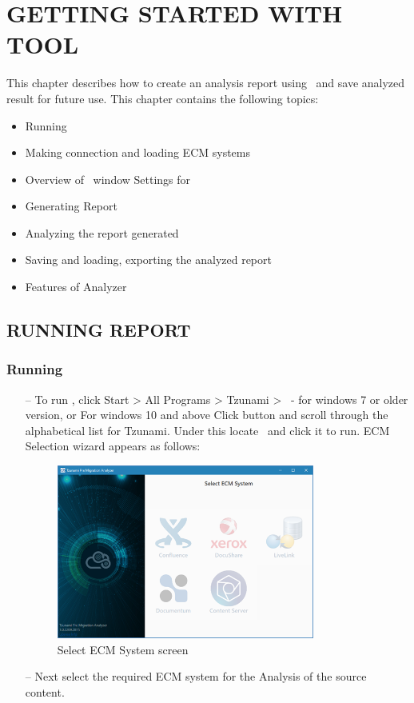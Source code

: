 \chapter{GETTING STARTED WITH \MakeUppercase{\appName} TOOL}
This chapter describes how to create an analysis report using \appName\ and save analyzed result for future use. This chapter contains the following topics:
\begin{itemize}
  \item Running \appName
  \item Making connection and loading ECM systems
  \item Overview of \appName\ window Settings for \appName
  \item Generating Report
  \item Analyzing the report generated
  \item Saving and loading, exporting the analyzed report
  \item Features of Analyzer
\end{itemize}
 \section{RUNNING \MakeUppercase{\appName} REPORT}

\subsection{Running \appName}
\begin{itemize}
\item[--] To run \appName, click Start > All Programs > Tzunami > \appName\ - for windows 7 or older version, or
For windows 10 and above
Click    button and scroll through the alphabetical list for Tzunami. Under this locate \appName\ and click it to run. ECM Selection wizard appears as follows:
\begin{figure} 
  \centering
	\includegraphics[width=0.8\textwidth]{Images/SelectEccmScreen.png}
 \caption{Select ECM System screen}
\end{figure}
\item[--] Next select the required ECM system for the Analysis of the source content.
\end{itemize}
